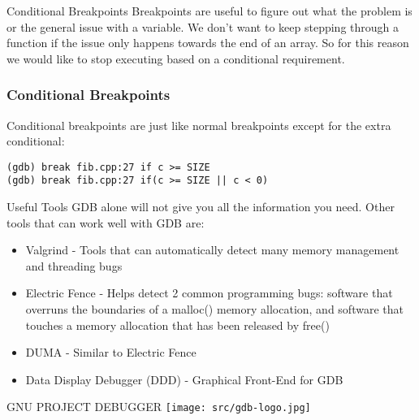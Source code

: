 \documentclass[11pt]{beamer}
\begin{document}
\begin{frame}{Conditional Breakpoints}
Breakpoints are useful to figure out what the problem is or the general issue with a variable. 
\break
\break
We don't want to keep stepping through a function if the issue only happens towards the end of an array. 
\break
\break
So for this reason we would like to stop executing based on a conditional requirement.
\end{frame}

\begin{frame}[fragile]
\frametitle{Conditional Breakpoints}
Conditional breakpoints are just like normal breakpoints except for the extra conditional:
\begin{lstlisting}[style=BashInputStyle]
(gdb) break fib.cpp:27 if c >= SIZE
(gdb) break fib.cpp:27 if(c >= SIZE || c < 0)
\end{lstlisting}
\end{frame}

\begin{frame}{Useful Tools}
GDB alone will not give you all the information you need. Other tools that can work well with GDB are:
\begin{itemize}
\item Valgrind - Tools that can automatically detect many memory management and threading bugs
\item Electric Fence - Helps detect 2 common programming bugs: software that overruns the boundaries of a malloc() memory allocation, and software that touches a memory allocation that has been released by free()
\item DUMA - Similar to Electric Fence
\item Data Display Debugger (DDD) - Graphical Front-End for GDB
\end{itemize}
\end{frame}

\begin{frame}{GNU PROJECT DEBUGGER}
\texttt{[image: src/gdb-logo.jpg]}
\end{frame}
\end{document}
